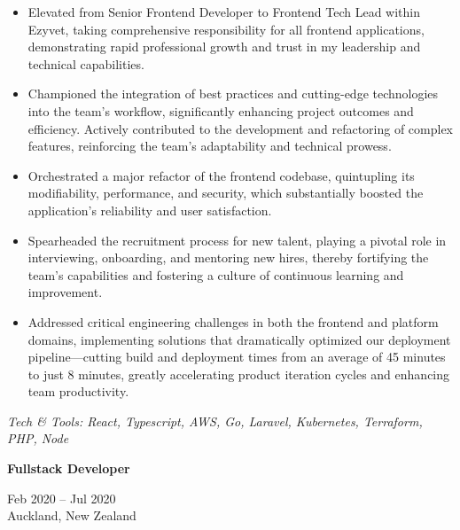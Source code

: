 \documentclass[10pt,a4paper,ragged2e,withhyper]{altacv}
\renewcommand{\cvevent}[4]{%
  \textbf{#1} %
  \hfill %
  \begin{minipage}[t]{.5\linewidth}
    \raggedleft %
    \small#3 %
    \\ %
    #4 %
  \end{minipage}
  \vspace{\baselineskip} %
}
\begin{document}
\begin{itemize}
  \item Elevated from Senior Frontend Developer to Frontend Tech Lead within Ezyvet, taking comprehensive responsibility for all frontend applications, demonstrating rapid professional growth and trust in my leadership and technical capabilities.
  \item Championed the integration of best practices and cutting-edge technologies into the team's workflow, significantly enhancing project outcomes and efficiency. Actively contributed to the development and refactoring of complex features, reinforcing the team's adaptability and technical prowess.
  \item Orchestrated a major refactor of the frontend codebase, quintupling its modifiability, performance, and security, which substantially boosted the application's reliability and user satisfaction.
  \item Spearheaded the recruitment process for new talent, playing a pivotal role in interviewing, onboarding, and mentoring new hires, thereby fortifying the team's capabilities and fostering a culture of continuous learning and improvement.
  \item Addressed critical engineering challenges in both the frontend and platform domains, implementing solutions that dramatically optimized our deployment pipeline—cutting build and deployment times from an average of 45 minutes to just 8 minutes, greatly accelerating product iteration cycles and enhancing team productivity.
\end{itemize}


  \vspace{0.5cm}

  \textit{Tech \& Tools: React, Typescript, AWS, Go, Laravel, Kubernetes, Terraform, PHP, Node}

  \divider



\cvevent{Fullstack Developer}{Infosys}{Feb 2020 -- Jul 2020}{Auckland, New Zealand}
\end{document}
